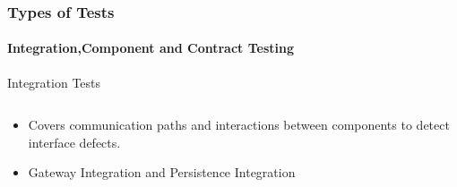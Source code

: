 \documentclass{beamer}
\begin{document}


\begin{frame}
	\frametitle{Types of Tests}	
	\framesubtitle{Integration,Component and Contract Testing }
Integration Tests
\begin{columns}
 \begin{column}{.49\textwidth}
	\begin{itemize}
		\item Covers communication paths and interactions between components to detect interface defects.
		\item Gateway Integration and Persistence Integration
		
	\end{itemize}
\end{column}
\end{columns}
\end{frame}
\end{document}
